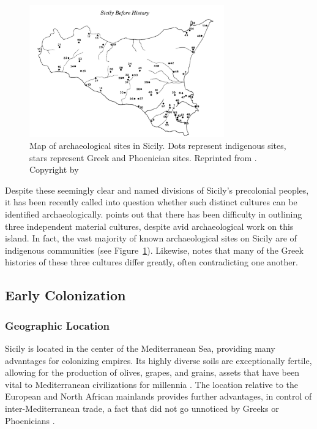 \documentclass[american]{../../../coursework}
\begin{document}
\begin{figure}
    \centering
    \includegraphics[width=0.75\textwidth]{sicily_fig_leighton.png}
    \caption{Map of archaeological sites in Sicily. Dots represent indigenous
    sites, stars represent Greek and Phoenician sites. Reprinted from
    . Copyright \citeyear{Lei99} by \citeauthor{Lei99}}
    \label{fig:Leighton}
\end{figure}

Despite these seemingly clear and named divisions of Sicily's precolonial
peoples, it has been recently called into question whether such distinct
cultures can be identified archaeologically. \textcite{Lei99} points out that
there has been difficulty in outlining three independent material cultures,
despite avid archaeological work on this island. In fact, the vast majority of
known archaeological sites on Sicily are of indigenous communities (see
Figure~\ref{fig:Leighton}). Likewise, \textcite{Bal12} notes that many of the
Greek histories of these three cultures differ greatly, often contradicting
one another.

\subsection{Early Colonization}

\subsubsection{Geographic Location}

Sicily is located in the center of the Mediterranean Sea, providing many
advantages for colonizing empires. Its highly diverse soils \parencite{Bal68}
are exceptionally fertile, allowing for the production of olives, grapes, and
grains, assets that have been vital to Mediterranean civilizations for
millennia \parencite{Bal12}. The location relative to the European and North
African mainlands provides further advantages, in control of
inter-Mediterranean trade, a fact that did not go unnoticed by Greeks or
Phoenicians \parencite{DeA03}.
\end{document}
